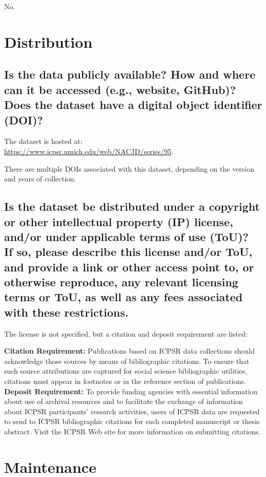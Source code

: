 \documentclass[letterpaper, 10 pt, conference]{ieeeconf}  %
\newcommand{\subtitle}[1]{{\\ \small \normalfont \color{purple} #1}}
\begin{document}
No.

\section{Distribution}
\subsection{Is the data publicly available? How and where can it be accessed (e.g., website, GitHub)? \subtitle{Does the dataset have a digital object identifier (DOI)?}}

The dataset is hosted at: \\ \href{https://www.icpsr.umich.edu/web/NACJD/series/95}{https://www.icpsr.umich.edu/web/NACJD/series/95}. 


There are multiple DOIs associated with this dataset, depending on the version and years of collection. 

\subsection{Is the dataset be distributed under a copyright or other intellectual property (IP) license, and/or under applicable terms of use (ToU)? \subtitle{If so, please describe this license and/or ToU, and provide a link or other access point to, or otherwise reproduce, any relevant licensing terms or ToU, as well as any fees associated with these restrictions.}}

The license is not specified, but a citation and deposit requirement are listed:

\textbf{Citation Requirement:} Publications based on ICPSR data collections should acknowledge those sources by means of bibliographic citations. To ensure that such source attributions are captured for social science bibliographic utilities, citations must appear in footnotes or in the reference section of publications. \\

\textbf{Deposit Requirement:} To provide funding agencies with essential information about use of archival resources and to facilitate the exchange of information about ICPSR participants' research activities, users of ICPSR data are requested to send to ICPSR bibliographic citations for each completed manuscript or thesis abstract. Visit the ICPSR Web site for more information on submitting citations.

\section{Maintenance}
\end{document}
